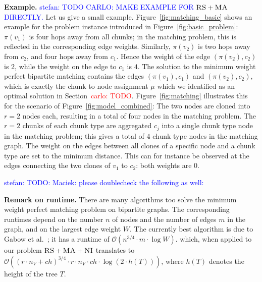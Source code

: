 \documentclass[9pt,twocolumn]{scrartcl}
\newcommand{\carlo}[1]{\textcolor{red}{carlo: #1}}
\newcommand{\stefan}[1]{\textcolor{blue}{stefan: #1}}
\newcommand{\MaFactor}{r}
\newcommand{\RedundancyFactor}{\ensuremath{r}}
\newcommand{\VmChunkAssignment}{\mu}
\newcommand{\NodeMapping}{\pi}
\newcommand{\VirtualNode}{v}
\newcommand{\achunk}{\ensuremath{c}}
\newcommand{\CC}{\textsc{NI}}
\newcommand{\RS}{\textsc{RS}}
\newcommand{\MA}{\textsc{MA}}
\newcommand{\Tree}{\ensuremath{T}}
\newcommand{\Vms}{\ensuremath{n_V}}
\newcommand{\ChunkTypes}{\ensuremath{ch}}
\begin{document}
\textbf{Example.} \stefan{TODO CARLO: MAKE EXAMPLE FOR $\RS+\MA$ DIRECTLY.} Let us give a small example.
Figure~\ref{fig:matching_basic} shows an example for the problem instance introduced in
Figure~\ref{fig:basic_problem}: $\NodeMapping(\VirtualNode_1)$ is four hops
away from all chunks; in the matching problem, this is
reflected in the corresponding edge
weights. Similarly, $\NodeMapping(\VirtualNode_2)$ is
two hops away from $\achunk_2$, and four hops away from $\achunk_1$. Hence the
weight of the edge $(\NodeMapping(\VirtualNode_2),\achunk_2)$ is $2$, while the
weight on the edge to $\achunk_1$ is $4$. The solution to the minimum weight
perfect bipartite matching contains the edges $(\NodeMapping(\VirtualNode_1),
\achunk_1)$ and $(\NodeMapping(\VirtualNode_2),
\achunk_2)$, which is exactly the chunk to node assignment $\VmChunkAssignment$
which we identified as an optimal solution in Section~\carlo{TODO}.
Figure~\ref{fig:matching} illustrates this for the scenario of
Figure~\ref{fig:model_combined}: The two nodes are
cloned into $\MaFactor = 2$ nodes each, resulting in a total of four nodes in
the matching problem. The $\RedundancyFactor = 2$ chunks of each chunk type are
aggregated $\achunk_j$ into a single chunk type node in the matching problem;
this gives a total of $4$ chunk type nodes in the matching graph. The weight
on the edges between all clones of a specific node and a chunk type are set to
the minimum distance. This can for instance be observed at the edges connecting
the two clones of $\VirtualNode_1$ to $\achunk_2$: both weights are 0.

\stefan{TODO: Maciek: please doublecheck the following as well:}

\textbf{Remark on runtime.} There are many algorithms too solve the minimum weight
perfect matching problem on bipartite
graphs. The corresponding runtimes depend on  the number $n$ of nodes and
the number of edges $m$ in the
graph, and on the largest edge weight $W$. The currently best algorithm is due to
Gabow et al.~\cite{gabow_scaling_algorithm}; it has a runtime of $\mathcal{O}(n^{3/4}
\cdot m \cdot \log W)$.  which, when applied to our problem $\RS+\MA+\CC$ translates to $\mathcal{O}((\MaFactor \cdot \Vms +
\ChunkTypes)^{3/4} \cdot  \MaFactor \cdot \Vms \cdot \ChunkTypes \cdot \log
(2 \cdot h(\Tree)))$, where $h(\Tree)$ denotes the height of the tree $\Tree$.
\end{document}
